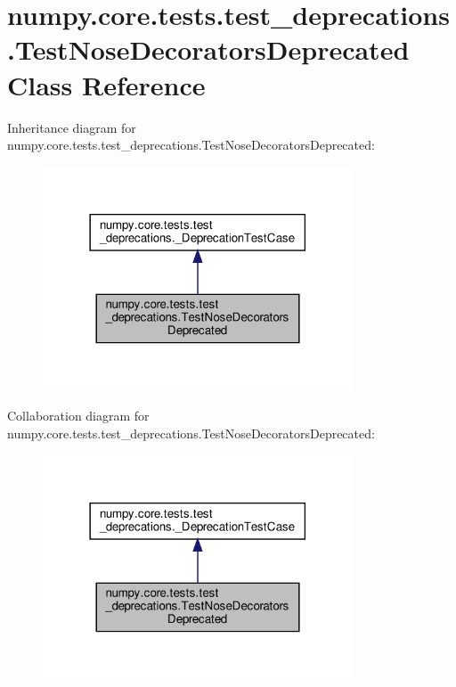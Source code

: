 \hypertarget{classnumpy_1_1core_1_1tests_1_1test__deprecations_1_1TestNoseDecoratorsDeprecated}{}\section{numpy.\+core.\+tests.\+test\+\_\+deprecations.\+Test\+Nose\+Decorators\+Deprecated Class Reference}
\label{classnumpy_1_1core_1_1tests_1_1test__deprecations_1_1TestNoseDecoratorsDeprecated}


Inheritance diagram for numpy.\+core.\+tests.\+test\+\_\+deprecations.\+Test\+Nose\+Decorators\+Deprecated\+:
\nopagebreak
\begin{figure}[H]
\begin{center}
\leavevmode
\includegraphics[width=261pt]{classnumpy_1_1core_1_1tests_1_1test__deprecations_1_1TestNoseDecoratorsDeprecated__inherit__graph}
\end{center}
\end{figure}


Collaboration diagram for numpy.\+core.\+tests.\+test\+\_\+deprecations.\+Test\+Nose\+Decorators\+Deprecated\+:
\nopagebreak
\begin{figure}[H]
\begin{center}
\leavevmode
\includegraphics[width=261pt]{classnumpy_1_1core_1_1tests_1_1test__deprecations_1_1TestNoseDecoratorsDeprecated__coll__graph}
\end{center}
\end{figure}
